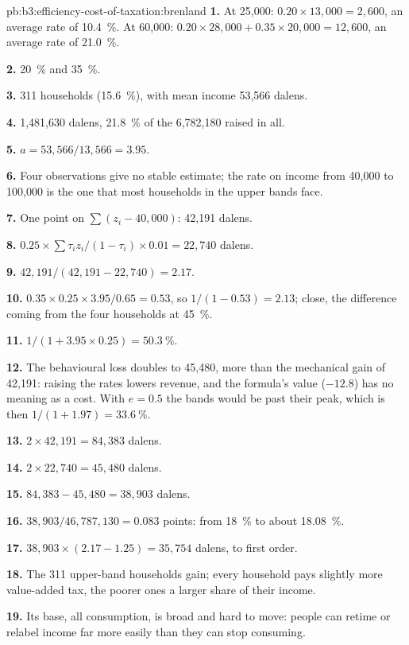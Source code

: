\begin{solution}{pb:b3:efficiency-cost-of-taxation:brenland}
\textbf{1.} At 25{,}000: $0.20 \times 13{,}000 = 2{,}600$, an average rate of 10.4~\%. At 60{,}000: $0.20 \times 28{,}000 + 0.35 \times
20{,}000 = 12{,}600$, an average rate of 21.0~\%.

\textbf{2.} 20~\% and 35~\%.

\textbf{3.} 311 households (15.6~\%), with mean income 53{,}566 dalens.

\textbf{4.} 1{,}481{,}630 dalens, 21.8~\% of the 6{,}782{,}180 raised in all.

\textbf{5.} $a = 53{,}566/13{,}566 = 3.95$.

\textbf{6.} Four observations give no stable estimate; the rate on income from
40{,}000 to 100{,}000 is the one that most households in the upper bands face.

\textbf{7.} One point on $\sum(z_i - 40{,}000)$: 42{,}191 dalens.

\textbf{8.} $0.25 \times \sum\tau_iz_i/(1 - \tau_i) \times 0.01 = 22{,}740$ dalens.

\textbf{9.} $42{,}191/(42{,}191 - 22{,}740) = 2.17$.

\textbf{10.} $0.35 \times 0.25 \times 3.95/0.65 = 0.53$, so $1/(1 - 0.53) = 2.13$; close, the difference coming from the
four households at 45~\%.

\textbf{11.} $1/(1 + 3.95 \times 0.25) = 50.3~\%$.

\textbf{12.} The behavioural loss doubles to 45{,}480, more than the mechanical gain of
42{,}191: raising the rates lowers revenue, and the formula's value ($-12.8$) has no
meaning as a cost. With $e = 0.5$ the bands would be past their peak, which is then
$1/(1 + 1.97) = 33.6~\%$.

\textbf{13.} $2 \times 42{,}191 = 84{,}383$ dalens.

\textbf{14.} $2 \times 22{,}740 = 45{,}480$ dalens.

\textbf{15.} $84{,}383 - 45{,}480 = 38{,}903$ dalens.

\textbf{16.} $38{,}903/46{,}787{,}130 = 0.083$ points: from 18~\% to about 18.08~\%.

\textbf{17.} $38{,}903 \times (2.17 - 1.25) = 35{,}754$ dalens, to first order.

\textbf{18.} The 311 upper-band households gain; every household pays slightly more
value-added tax, the poorer ones a larger share of their income.

\textbf{19.} Its base, all consumption, is broad and hard to move: people can retime
or relabel income far more easily than they can stop consuming.


\end{solution}

